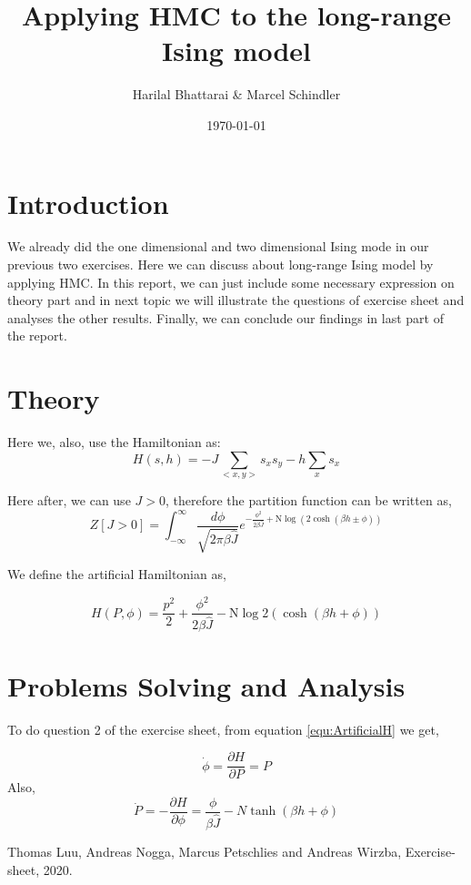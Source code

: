\documentclass[11pt, a4paper, DIV=12]{scrartcl}
\title{Applying HMC to the long-range Ising model}
\date{\today}
\author{Harilal Bhattarai \& Marcel Schindler}
\begin{document}
	\maketitle
\section{Introduction}

We already did the one dimensional and two dimensional Ising mode in our previous two exercises. Here we can discuss about long-range Ising model by applying HMC. In this report, we can just include some necessary expression on theory part and in next topic we will illustrate the questions of exercise sheet and analyses the other results. Finally, we can conclude our findings in last part of the report.
\section{Theory}
Here we, also, use the Hamiltonian as:
\begin{equation}
H(s, h)= -J \sum_{<x,y>}s_{x}s_{y} - h \sum_{x}s_{x}
\end{equation}

Here after, we can use $ J > 0 $, therefore the partition function can be written as,
\begin{equation}
Z[J>0]=\int_{-\infty}^{\infty}\frac{d\phi}{\sqrt{2\pi \beta \hat{J}}} e^{-\frac{\phi^2}{2\beta \hat{J}} + \text{N}\log(2\cosh(\beta h \pm \phi))}
\end{equation}

We define the artificial Hamiltonian as,

\begin{equation}
{H(P, \phi)}= \frac{p^2}{2} + \frac{\phi^2}{2\beta \hat{J}} - \text{N}\log 2(\cosh(\beta h + \phi))
\label{equ:ArtificialH}
\end{equation}

\section{Problems Solving and Analysis}

To do question 2 of the exercise sheet, from equation \ref{equ:ArtificialH} we get,

\begin{equation}
\dot{\phi}=\frac{\partial H}{\partial P}= P
\end{equation}
Also,
\begin{equation}
\dot{P}=-\frac{\partial H}{\partial \phi}= \frac{\phi}{\beta \hat{J}} - N \tanh(\beta h+ \phi)
\end{equation}

\begin{thebibliography}{12}
	Thomas Luu, Andreas Nogga, Marcus Petschlies and  Andreas Wirzba, Exercise-sheet, 2020. 
	
	
\end{thebibliography}	
\end{document}
